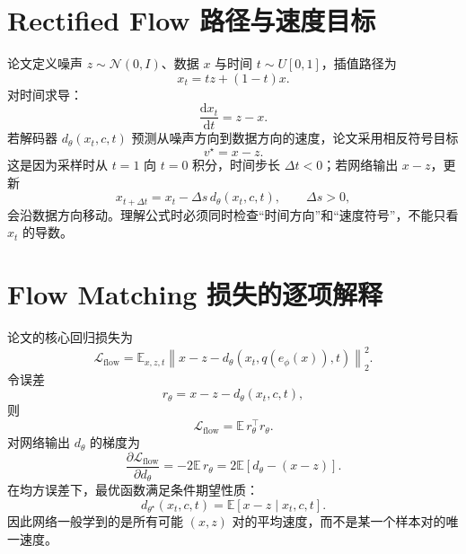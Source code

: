 \documentclass[UTF8,12pt,a4paper,fontset=none]{ctexart}
\numberwithin{equation}{section}
\newcommand{\E}{\mathbb{E}}
\newcommand{\Loss}{\mathcal{L}}
\newcommand{\norm}[1]{\left\lVert #1\right\rVert}
\newcommand{\dd}{\mathrm{d}}
\begin{document}
\section{Rectified Flow 路径与速度目标}
论文定义噪声 $z\sim\mathcal N(0,I)$、数据 $x$ 与时间 $t\sim U[0,1]$，插值路径为
\begin{equation}
 \boxed{x_t=t z+(1-t)x.}
\end{equation}
对时间求导：
\begin{equation}
 \frac{\dd x_t}{\dd t}=z-x.
\end{equation}
若解码器 $d_\theta(x_t,c,t)$ 预测从噪声方向到数据方向的速度，论文采用相反符号目标
\begin{equation}
 v^\star=x-z.
\end{equation}
这是因为采样时从 $t=1$ 向 $t=0$ 积分，时间步长 $\Delta t<0$；若网络输出 $x-z$，更新
\begin{equation}
 x_{t+\Delta t}=x_t-\Delta s\,d_\theta(x_t,c,t),\qquad \Delta s>0,
\end{equation}
会沿数据方向移动。理解公式时必须同时检查“时间方向”和“速度符号”，不能只看 $x_t$ 的导数。

\section{Flow Matching 损失的逐项解释}
论文的核心回归损失为
\begin{equation}
 \boxed{\Loss_{\mathrm{flow}}
 =\E_{x,z,t}\norm{x-z-d_\theta(x_t,q(e_\phi(x)),t)}_2^2.}
\end{equation}
令误差
\begin{equation}
 r_\theta=x-z-d_\theta(x_t,c,t),
\end{equation}
则
\begin{equation}
 \Loss_{\mathrm{flow}}=\E\,r_\theta^\top r_\theta.
\end{equation}
对网络输出 $d_\theta$ 的梯度为
\begin{equation}
 \frac{\partial\Loss_{\mathrm{flow}}}{\partial d_\theta}
 =-2\E\,r_\theta
 =2\E\left[d_\theta-(x-z)\right].
\end{equation}
在均方误差下，最优函数满足条件期望性质：
\begin{equation}
 d_{\theta^\star}(x_t,c,t)
 =\E[x-z\mid x_t,c,t].
\end{equation}
因此网络一般学到的是所有可能 $(x,z)$ 对的平均速度，而不是某一个样本对的唯一速度。
\end{document}
